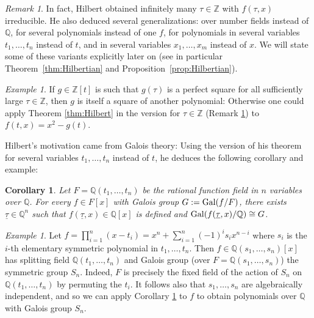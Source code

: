 \documentclass[10pt,a4paper]{amsart}
\theoremstyle{plain}
\newtheorem{corollary}[theorem]{Corollary}
\theoremstyle{remark}
\newtheorem{remark}[theorem]{Remark}
\newtheorem{example}[theorem]{Example}
\numberwithin{theorem}{section}
\begin{document}
\begin{remark}\label{rem:Hilbert}
In fact, Hilbert obtained infinitely many $\tau\in\mathbb{Z}$ with $f(\tau,x)$ irreducible.
He also deduced several generalizations:
over number fields instead of $\mathbb{Q}$,
for several polynomials instead of one $f$, for polynomials in several variables $t_1,\dots,t_n$ instead of $t$,
and in several variables $x_1,\dots,x_m$ instead of $x$.
We will state some of these variants explicitly later on
(see in particular Theorem~\ref{thm:Hilbertian} and Proposition~\ref{prop:Hilbertian}).
\end{remark}

\begin{example}
If $g\in\mathbb{Z}[t]$ is such that $g(\tau)$ is a perfect square for all sufficiently large $\tau\in\mathbb{Z}$, then $g$ is itself a square of another polynomial:
Otherwise one could apply Theorem \ref{thm:Hilbert} in the version for $\tau\in\mathbb{Z}$ (Remark \ref{rem:Hilbert}) to $f(t,x)=x^2-g(t)$.
\end{example}

Hilbert's motivation came from Galois theory:
Using the version of his theorem for several variables $t_1,\dots,t_n$ instead of $t$,
he deduces the following corollary \cite[Theorem IV]{Hilbert} and example:

\begin{corollary}\label{cor:Hilbert}
Let $F=\mathbb{Q}(t_1,\dots,t_n)$ be the rational function field in $n$ variables over $\mathbb{Q}$.
For every $f\in F[x]$ with Galois group $G:={\rm Gal}(f/F)$, there exists $\underline{\tau}\in\mathbb{Q}^n$
such that 
$f(\underline{\tau},x)\in\mathbb{Q}[x]$
is defined
and
${\rm Gal}(f(\underline{\tau},x)/\mathbb{Q})\cong G$.
\end{corollary}

\begin{example}
Let 
$f=\prod_{i=1}^n(x-t_i)=x^n+\sum_{i=1}^n(-1)^is_ix^{n-i}$ 
where
$s_i$ is the $i$-th elementary symmetric polynomial in $t_1,\dots,t_n$.
Then $f\in \mathbb{Q}(s_1,\dots,s_n)[x]$ has splitting field $\mathbb{Q}(t_1,\dots,t_n)$
and Galois group (over $F=\mathbb{Q}(s_1,\dots,s_n)$) the symmetric group $S_n$.
Indeed, $F$ is precisely the fixed field of 
the action of $S_n$ on
$\mathbb{Q}(t_1,\dots,t_n)$ 
by permuting the $t_i$.
It follows also that $s_1,\dots,s_n$ are algebraically independent,
and so we can apply Corollary \ref{cor:Hilbert} to $f$ to obtain
polynomials over $\mathbb{Q}$ with Galois group $S_n$.
\end{example}
\end{document}
